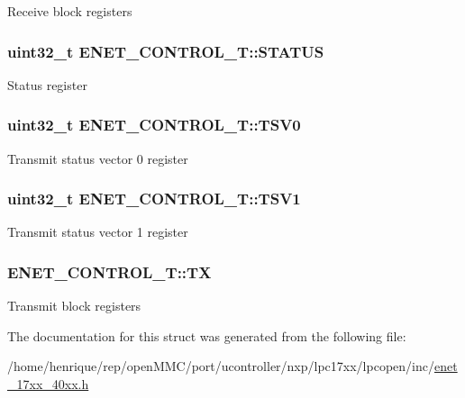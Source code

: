 Receive block registers \hypertarget{structENET__CONTROL__T_aaaef8a4b3d2a27e488d5e2e8a236640a}{
\subsubsection[{S\-T\-A\-T\-U\-S}]{ uint32\-\_\-t E\-N\-E\-T\-\_\-\-C\-O\-N\-T\-R\-O\-L\-\_\-\-T\-::\-S\-T\-A\-T\-U\-S}}\label{structENET__CONTROL__T_aaaef8a4b3d2a27e488d5e2e8a236640a}
Status register \hypertarget{structENET__CONTROL__T_adfd0bf0a173cb107271eba4fa8f20de8}{
\subsubsection[{T\-S\-V0}]{ uint32\-\_\-t E\-N\-E\-T\-\_\-\-C\-O\-N\-T\-R\-O\-L\-\_\-\-T\-::\-T\-S\-V0}}\label{structENET__CONTROL__T_adfd0bf0a173cb107271eba4fa8f20de8}
Transmit status vector 0 register \hypertarget{structENET__CONTROL__T_a03b03ad79457f3f25cc3d1d2d564310a}{
\subsubsection[{T\-S\-V1}]{ uint32\-\_\-t E\-N\-E\-T\-\_\-\-C\-O\-N\-T\-R\-O\-L\-\_\-\-T\-::\-T\-S\-V1}}\label{structENET__CONTROL__T_a03b03ad79457f3f25cc3d1d2d564310a}
Transmit status vector 1 register \hypertarget{structENET__CONTROL__T_a1010eaf24cd6af0d6355b4cd34d8e90a}{
\subsubsection[{T\-X}]{ E\-N\-E\-T\-\_\-\-C\-O\-N\-T\-R\-O\-L\-\_\-\-T\-::\-T\-X}}\label{structENET__CONTROL__T_a1010eaf24cd6af0d6355b4cd34d8e90a}
Transmit block registers 

The documentation for this struct was generated from the following file\-:\begin{DoxyCompactItemize}
\item 
/home/henrique/rep/open\-M\-M\-C/port/ucontroller/nxp/lpc17xx/lpcopen/inc/\hyperlink{enet__17xx__40xx_8h}{enet\-\_\-17xx\-\_\-40xx.\-h}\end{DoxyCompactItemize}

